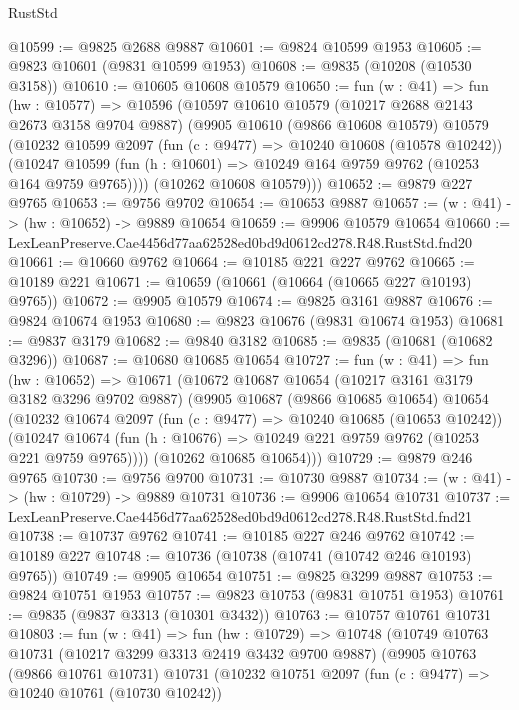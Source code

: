 \begin{lexlean}{RustStd}
\begin{coremodule}
@10599 := @9825 @2688 @9887
@10601 := @9824 @10599 @1953
@10605 := @9823 @10601 (@9831 @10599 @1953)
@10608 := @9835 (@10208 (@10530 @3158))
@10610 := @10605 @10608 @10579
@10650 := fun (w : @41) =>
  fun (hw : @10577) =>
  @10596
    (@10597
      @10610
      @10579
      (@10217 @2688 @2143 @2673 @3158 @9704 @9887)
      (@9905
        @10610
        (@9866 @10608 @10579)
        @10579
        (@10232
          @10599
          @2097
          (fun (c : @9477) => @10240 @10608 (@10578 @10242))
          (@10247 @10599 (fun (h : @10601) => @10249 @164 @9759 @9762 (@10253 @164 @9759 @9765))))
        (@10262 @10608 @10579)))
@10652 := @9879 @227 @9765
@10653 := @9756 @9702
@10654 := @10653 @9887
@10657 := (w : @41) -> (hw : @10652) -> @9889 @10654
@10659 := @9906 @10579 @10654
@10660 := LexLeanPreserve.Cae4456d77aa62528ed0bd9d0612cd278.R48.RustStd.fnd20
@10661 := @10660 @9762
@10664 := @10185 @221 @227 @9762
@10665 := @10189 @221
@10671 := @10659 (@10661 (@10664 (@10665 @227 @10193) @9765))
@10672 := @9905 @10579
@10674 := @9825 @3161 @9887
@10676 := @9824 @10674 @1953
@10680 := @9823 @10676 (@9831 @10674 @1953)
@10681 := @9837 @3179
@10682 := @9840 @3182
@10685 := @9835 (@10681 (@10682 @3296))
@10687 := @10680 @10685 @10654
@10727 := fun (w : @41) =>
  fun (hw : @10652) =>
  @10671
    (@10672
      @10687
      @10654
      (@10217 @3161 @3179 @3182 @3296 @9702 @9887)
      (@9905
        @10687
        (@9866 @10685 @10654)
        @10654
        (@10232
          @10674
          @2097
          (fun (c : @9477) => @10240 @10685 (@10653 @10242))
          (@10247 @10674 (fun (h : @10676) => @10249 @221 @9759 @9762 (@10253 @221 @9759 @9765))))
        (@10262 @10685 @10654)))
@10729 := @9879 @246 @9765
@10730 := @9756 @9700
@10731 := @10730 @9887
@10734 := (w : @41) -> (hw : @10729) -> @9889 @10731
@10736 := @9906 @10654 @10731
@10737 := LexLeanPreserve.Cae4456d77aa62528ed0bd9d0612cd278.R48.RustStd.fnd21
@10738 := @10737 @9762
@10741 := @10185 @227 @246 @9762
@10742 := @10189 @227
@10748 := @10736 (@10738 (@10741 (@10742 @246 @10193) @9765))
@10749 := @9905 @10654
@10751 := @9825 @3299 @9887
@10753 := @9824 @10751 @1953
@10757 := @9823 @10753 (@9831 @10751 @1953)
@10761 := @9835 (@9837 @3313 (@10301 @3432))
@10763 := @10757 @10761 @10731
@10803 := fun (w : @41) =>
  fun (hw : @10729) =>
  @10748
    (@10749
      @10763
      @10731
      (@10217 @3299 @3313 @2419 @3432 @9700 @9887)
      (@9905
        @10763
        (@9866 @10761 @10731)
        @10731
        (@10232
          @10751
          @2097
          (fun (c : @9477) => @10240 @10761 (@10730 @10242))

\end{coremodule}
\end{lexlean}
